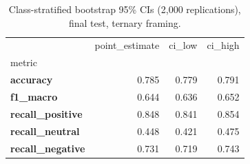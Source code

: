\begin{table}
\caption{Class-stratified bootstrap 95\% CIs (2{,}000 replications), final test, ternary framing.}
\label{tab:rq1_bootstrap_ternary}
\begin{tabular}{lrrr}
\toprule
 & point_estimate & ci_low & ci_high \\
metric &  &  &  \\
\midrule
\textbf{accuracy} & 0.785 & 0.779 & 0.791 \\
\textbf{f1_macro} & 0.644 & 0.636 & 0.652 \\
\textbf{recall_positive} & 0.848 & 0.841 & 0.854 \\
\textbf{recall_neutral} & 0.448 & 0.421 & 0.475 \\
\textbf{recall_negative} & 0.731 & 0.719 & 0.743 \\
\bottomrule
\end{tabular}
\end{table}
